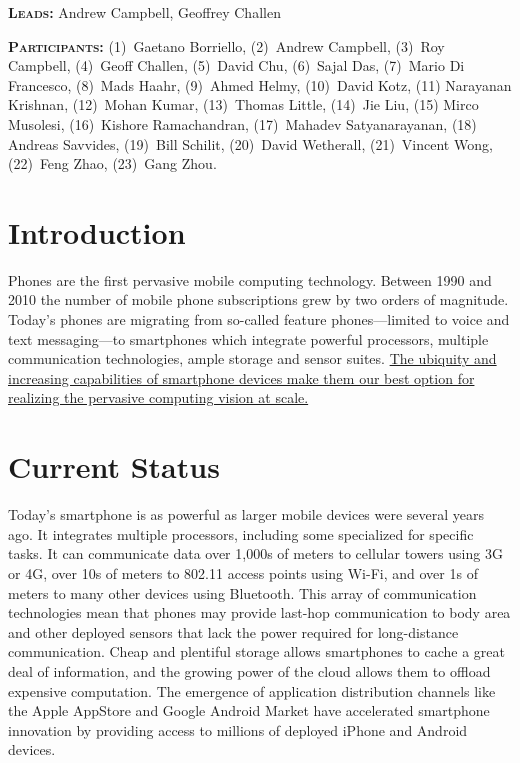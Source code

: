 \textbf{\scshape Leads:} Andrew Campbell, Geoffrey Challen

\textbf{\scshape Participants:} (1)~Gaetano Borriello, (2)~Andrew Campbell,
(3)~Roy Campbell, (4)~Geoff Challen, (5)~David Chu, (6)~Sajal Das, (7)~Mario
Di Francesco, (8)~Mads Haahr, (9)~Ahmed Helmy, (10)~David Kotz, (11)
Narayanan Krishnan, (12)~Mohan Kumar, (13)~Thomas Little, (14)~Jie Liu, (15)
Mirco Musolesi, (16)~Kishore Ramachandran, (17)~Mahadev Satyanarayanan, (18)
Andreas Savvides, (19)~Bill Schilit, (20)~David Wetherall, (21)~Vincent Wong,
(22)~Feng Zhao, (23)~Gang Zhou.

\section{Introduction}

Phones are the first pervasive mobile computing technology. Between 1990 and
2010 the number of mobile phone subscriptions grew by two orders of
magnitude. Today's phones are migrating from so-called feature
phones---limited to voice and text messaging---to smartphones which integrate
powerful processors, multiple communication technologies, ample storage and
sensor suites. \uline{The ubiquity and increasing capabilities of smartphone
devices make them our best option for realizing the pervasive computing
vision at scale.}

\section{Current Status}

Today's smartphone is as powerful as larger mobile devices were several years
ago. It integrates multiple processors, including some specialized for
specific tasks. It can communicate data over 1,000s of meters to cellular
towers using 3G or 4G, over 10s of meters to 802.11 access points using
Wi-Fi, and over 1s of meters to many other devices using Bluetooth. This
array of communication technologies mean that phones may provide last-hop
communication to body area and other deployed sensors that lack the power
required for long-distance communication. Cheap and plentiful storage allows
smartphones to cache a great deal of information, and the growing power of
the cloud allows them to offload expensive computation. The emergence of
application distribution channels like the Apple AppStore and Google Android
Market have accelerated smartphone innovation by providing access to millions
of deployed iPhone and Android devices.

